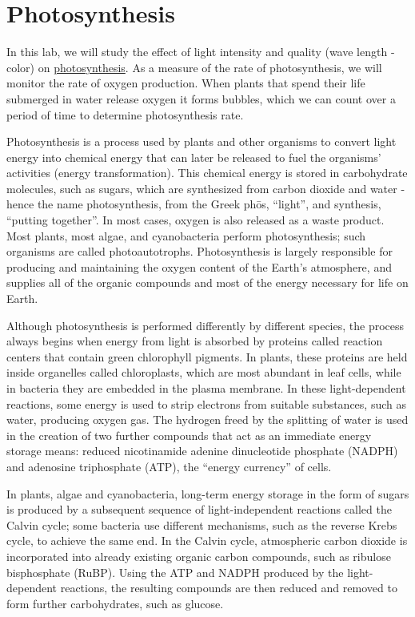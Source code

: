 \chapter{Photosynthesis}\label{photosynthesis}

In this lab, we will study the effect of light intensity and quality
(wave length - color) on
\href{https://en.wikipedia.org/wiki/Photosynthesis}{photosynthesis}. As
a measure of the rate of photosynthesis, we will monitor the rate of
oxygen production. When plants that spend their life submerged in water
release oxygen it forms bubbles, which we can count over a period of
time to determine photosynthesis rate.

Photosynthesis is a process used by plants and other organisms to
convert light energy into chemical energy that can later be released to
fuel the organisms' activities (energy transformation). This chemical
energy is stored in carbohydrate molecules, such as sugars, which are
synthesized from carbon dioxide and water - hence the name
photosynthesis, from the Greek phōs, ``light'', and synthesis, ``putting
together''. In most cases, oxygen is also released as a waste product.
Most plants, most algae, and cyanobacteria perform photosynthesis; such
organisms are called photoautotrophs. Photosynthesis is largely
responsible for producing and maintaining the oxygen content of the
Earth's atmosphere, and supplies all of the organic compounds and most
of the energy necessary for life on Earth.

Although photosynthesis is performed differently by different species,
the process always begins when energy from light is absorbed by proteins
called reaction centers that contain green chlorophyll pigments. In
plants, these proteins are held inside organelles called chloroplasts,
which are most abundant in leaf cells, while in bacteria they are
embedded in the plasma membrane. In these light-dependent reactions,
some energy is used to strip electrons from suitable substances, such as
water, producing oxygen gas. The hydrogen freed by the splitting of
water is used in the creation of two further compounds that act as an
immediate energy storage means: reduced nicotinamide adenine
dinucleotide phosphate (NADPH) and adenosine triphosphate (ATP), the
``energy currency'' of cells.

In plants, algae and cyanobacteria, long-term energy storage in the form
of sugars is produced by a subsequent sequence of light-independent
reactions called the Calvin cycle; some bacteria use different
mechanisms, such as the reverse Krebs cycle, to achieve the same end. In
the Calvin cycle, atmospheric carbon dioxide is incorporated into
already existing organic carbon compounds, such as ribulose bisphosphate
(RuBP). Using the ATP and NADPH produced by the light-dependent
reactions, the resulting compounds are then reduced and removed to form
further carbohydrates, such as glucose.

